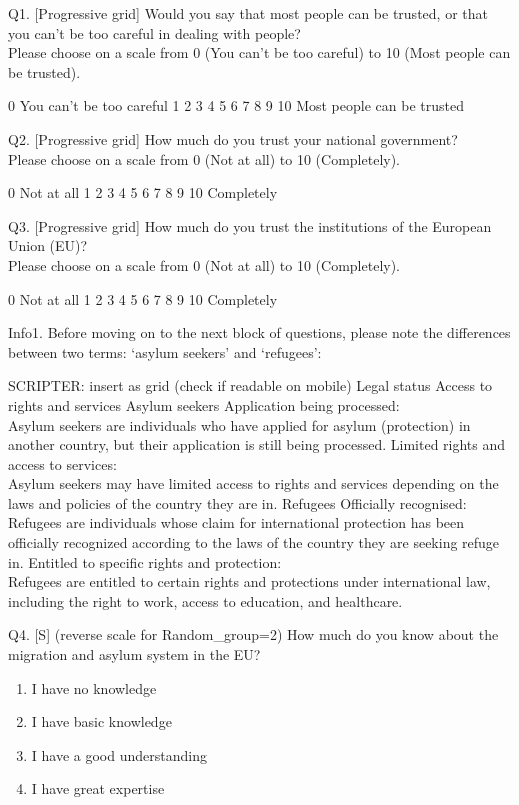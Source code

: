\documentclass[
  12pt,
  a4paper,
]{article}
\providecommand{\tightlist}{%
  \setlength{\itemsep}{0pt}\setlength{\parskip}{0pt}}
\begin{document}
Q1. {[}Progressive grid{]} Would you say that most people can be trusted, or that you can't be too careful in dealing with people?\\
Please choose on a scale from 0 (You can't be too careful) to 10 (Most people can be trusted).

0
You can't be too careful 1 2 3 4 5 6 7 8 9 10
Most people can be trusted

Q2. {[}Progressive grid{]} How much do you trust your national government?\\
Please choose on a scale from 0 (Not at all) to 10 (Completely).

0
Not at all 1 2 3 4 5 6 7 8 9 10
Completely

Q3. {[}Progressive grid{]} How much do you trust the institutions of the European Union (EU)?\\
Please choose on a scale from 0 (Not at all) to 10 (Completely).

0
Not at all 1 2 3 4 5 6 7 8 9 10
Completely

Info1. Before moving on to the next block of questions, please note the differences between two terms: `asylum seekers' and `refugees':

SCRIPTER: insert as grid (check if readable on mobile)
Legal status Access to rights and services
Asylum seekers Application being processed:\\
Asylum seekers are individuals who have applied for asylum (protection) in another country, but their application is still being processed. Limited rights and access to services:\\
Asylum seekers may have limited access to rights and services depending on the laws and policies of the country they are in.
Refugees Officially recognised:\\
Refugees are individuals whose claim for international protection has been officially recognized according to the laws of the country they are seeking refuge in. Entitled to specific rights and protection:\\
Refugees are entitled to certain rights and protections under international law, including the right to work, access to education, and healthcare.

Q4. {[}S{]} (reverse scale for Random\_group=2) How much do you know about the migration and asylum system in the EU?

\begin{enumerate}
\def\labelenumi{\arabic{enumi}.}
\tightlist
\item
  I have no knowledge\\
\item
  I have basic knowledge\\
\item
  I have a good understanding\\
\item
  I have great expertise
\end{enumerate}
\end{document}

